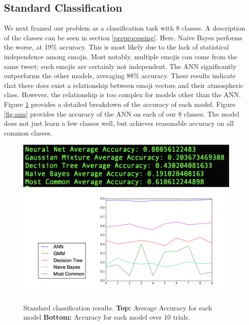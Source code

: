 \documentclass[12pt]{article}
\begin{document}
\subsection{Standard Classification}
We next framed our problem as a classification task with 8 classes. A description of the classes can be seen in section \ref{preprocessing}. Here, Naive Bayes performs the worse, at 19\% accuracy. This is most likely due to the lack of statistical independence among emojis. Most notably, multiple emojis can come from the same tweet; such emojis are certainly not independent. The ANN significantly outperforms the other models, averaging 88\% accuracy. These results indicate that there does exist a relationship between emoji vectors and their atmospheric class. However, the relationship is too complex for models other than the ANN. Figure \ref{fig:standard} provides a detailed breakdown of the accuracy of each model. Figure \ref{fig:ann} provides the accuracy of the ANN on each of our 8 classes. The model does not just learn a few classes well, but achieves reasonable accuracy on all common classes.

\begin{figure}[h]
\includegraphics[scale=0.6]{standardavg}
\includegraphics[scale=0.7]{standardgraph}
\centering
\caption{Standard classification results. \textbf{Top:} Average Accuracy for each model \textbf{Bottom:} Accuracy for each model over 10 trials.}
\label{fig:standard}
\end{figure}
\end{document}
